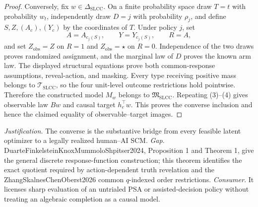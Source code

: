 \documentclass{article}
\begin{document}
\begin{proof}
Conversely, fix \(w\in\Delta_{\mathrm{SLCC}}\).  On a finite probability space draw \(T=t\) with probability \(w_t\), independently draw \(D=j\) with probability \(\rho_j\), and define \(S,Z,(A_c),(Y_c)\) by the coordinates of \(T\).  Under policy \(j\), set
\[
A=A_{c_j(S)},
\qquad
Y=Y_{c_j(S)},
\qquad
R=A,
\]
and set \(Z_{\mathrm{obs}}=Z\) on \(R=1\) and \(Z_{\mathrm{obs}}=\star\) on \(R=0\).  Independence of the two draws proves randomized assignment, and the marginal law of \(D\) proves the known arm law.  The displayed structural equations prove both common-response assumptions, reveal-action, and masking.  Every type receiving positive mass belongs to \(\mathcal T_{\mathrm{SLCC}}\), so the four unit-level outcome restrictions hold pointwise.  Therefore the constructed model \(M_w\) belongs to \(\mathfrak M_{\mathrm{SLCC}}\).  Repeating (3)--(4) gives observable law \(Bw\) and causal target \(h_e^{\top}w\).  This proves the converse inclusion and hence the claimed equality of observable--target images.
\end{proof}
\par\smallskip\noindent \textit{Justification.} The converse is the substantive bridge from every feasible latent optimizer to a legally realized human--AI SCM. \textit{Gap.} DuarteFinkelsteinKnoxMummoloShpitser2024, Proposition 1 and Theorem 1, give the general discrete response-function construction; this theorem identifies the exact quotient required by action-dependent truth revelation and the ZhangSkalnesChenOberst2026 common \(q\)-indexed order restrictions. \textit{Consumer.} It licenses sharp evaluation of an untrialed PSA or assisted-decision policy without treating an algebraic completion as a causal model.
\end{document}
